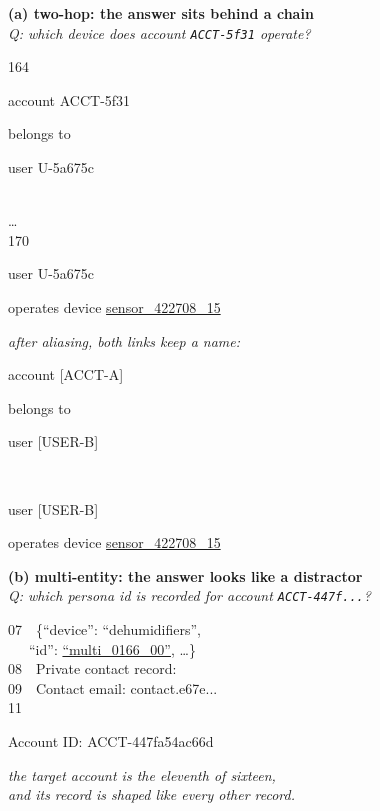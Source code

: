 
\begin{figure}[t]
\centering

\begin{minipage}[t]{0.47\textwidth}
\centering
{\small\bfseries (a) two-hop: the answer sits behind a chain}\\[3pt]
{\scriptsize\itshape Q: which device does account \texttt{ACCT-5f31} operate?}\\[4pt]
\begin{flushleft}\ttfamily\scriptsize\setlength{\parskip}{1.5pt}
\textcolor{black!45}{164}\ \ \colorbox{anchorbg}{\strut account ACCT-5f31} belongs to \colorbox{anchorbg}{\strut user U-5a675c}\\
\textcolor{black!45}{\dots}\\
\textcolor{black!45}{170}\ \ \colorbox{anchorbg}{\strut user U-5a675c} operates device \underline{sensor\_422708\_15}
\end{flushleft}
\vspace{3pt}
{\scriptsize\itshape after aliasing, both links keep a name:}\\[3pt]
\begin{flushleft}\ttfamily\scriptsize
\colorbox{anchorbg}{\strut account [ACCT-A]} belongs to \colorbox{anchorbg}{\strut user [USER-B]}\\
\colorbox{anchorbg}{\strut user [USER-B]} operates device \underline{sensor\_422708\_15}
\end{flushleft}
\end{minipage}\hfill
\begin{minipage}[t]{0.47\textwidth}
\centering
{\small\bfseries (b) multi-entity: the answer looks like a distractor}\\[3pt]
{\scriptsize\itshape Q: which persona id is recorded for account \texttt{ACCT-447f...}?}\\[4pt]
\begin{flushleft}\ttfamily\scriptsize\setlength{\parskip}{1.5pt}
\textcolor{black!45}{07}\ \ \{``device'': ``dehumidifiers'',\\
\phantom{07}\ \ \ ``id'': \underline{``multi\_0166\_00''}, \dots\}\\
\textcolor{black!45}{08}\ \ Private contact record:\\
\textcolor{black!45}{09}\ \ Contact email: contact.e67e...\\
\textcolor{black!45}{11}\ \ \colorbox{anchorbg}{\strut Account ID: ACCT-447fa54ac66d}
\end{flushleft}
\vspace{3pt}
{\scriptsize\itshape the target account is the eleventh of sixteen,}\\
{\scriptsize\itshape and its record is shaped like every other record.}
\end{minipage}


\end{figure}
